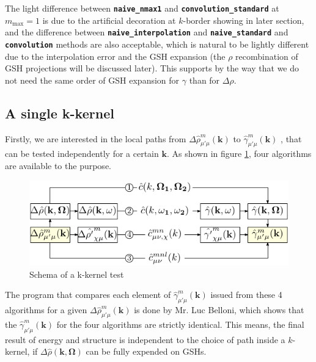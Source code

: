The light difference between \texttt{\textbf{naive\_nmax1}} and \texttt{\textbf{convolution\_standard}}
at $m_{\max}=1$ is due to the artificial decoration at $k$-border
showing in later section, and the difference between \texttt{\textbf{naive\_interpolation}}
and \texttt{\textbf{naive\_standard}} and \texttt{\textbf{convolution}}
methods are also acceptable, which is natural to be lightly different
due to the interpolation error and the \acs{GSH} expansion (the $\rho$
recombination of \acs{GSH} projections will be discussed later).
This supports by the way that we do not need the same order of \acs{GSH}
expansion for $\gamma$ than for $\Delta\rho$.

\subsection{A single k-kernel\label{subsec:A-single-k-kernel}}

Firstly, we are interested in the local paths from $\Delta\hat{\rho}_{\mu'\mu}^{m}(\mathbf{k})$
to $\hat{\gamma}_{\mu'\mu}^{m}(\mathbf{k})$ , that can be tested
independently for a certain $\mathbf{k}$. As shown in figure \ref{fig:k-kernel},
four algorithms are available to the purpose.

\begin{figure}[h]
\begin{centering}
\includegraphics{_figure/algorithms_q}
\par\end{centering}
\caption{Schema of a k-kernel test \label{fig:k-kernel} }
\end{figure}

The program that compares each element of $\hat{\gamma}_{\mu'\mu}^{m}(\mathbf{k})$
issued from these 4 algorithms for a given $\Delta\hat{\rho}_{\mu'\mu}^{m}(\mathbf{k})$
is done by Mr. Luc Belloni, which shows that the $\hat{\gamma}_{\mu'\mu}^{m}(\mathbf{k})$
for the four algorithms are strictly identical. This means, the final
result of energy and structure is independent to the choice of path
inside a $k$-kernel, if $\Delta\hat{\rho}(\mathbf{k},\mathbf{\Omega})$
can be fully expended on \acs{GSH}s.

